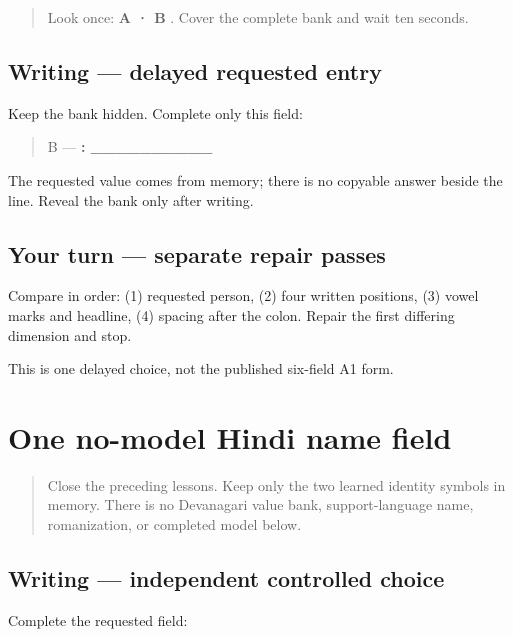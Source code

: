\begin{quote}
Look once: \textbf{A  · B }. Cover the complete bank and wait ten seconds.
\end{quote}

\subsection*{Writing — delayed requested entry}
Keep the bank hidden. Complete only this field:

\begin{quote}
B — \textbf{: \_\_\_\_\_\_\_\_\_\_}
\end{quote}

The requested value comes from memory; there is no copyable answer beside the line. Reveal the bank only after writing.

\subsection*{Your turn — separate repair passes}
Compare in order: (1) requested person, (2) four written positions, (3) vowel marks and headline, (4) spacing after the colon. Repair the first differing dimension and stop.

\begin{tcolorbox}[breakable,colback=teal!4,colframe=teal!35!black,title={Before you move on}]
This is one delayed choice, not the published six-field A1 form.
\end{tcolorbox}
\section[\texorpdfstring{\hi{नाम}: \_\_\_\_\_\_\_\_\_\_}{नाम: \_\_\_\_\_\_\_\_\_\_}]{One no-model Hindi name field}

\label{lesson:HI-A1F01-name-no-model}



\begin{quote}
Close the preceding lessons. Keep only the two learned identity symbols in memory. There is no Devanagari value bank, support-language name, romanization, or completed model below.
\end{quote}

\subsection*{Writing — independent controlled choice}
Complete the requested field:

